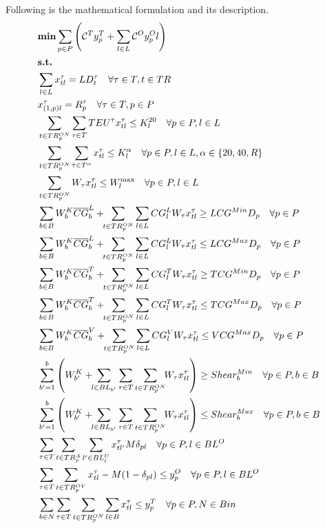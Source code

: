 \documentclass[preprint,12pt,authoryear]{elsarticle}
\begin{document}
Following is the mathematical formulation and its description.
\begin{align}
    & \text{\bf min} \sum_{p\in P} \left(\mathcal{C}^Ty^T_p + \sum_{l\in L} \mathcal{C}^Oy^O_pl \right) \label{pacino:obj}\\
    & \text{\bf s.t.}\nonumber \\
    & \sum_{l\in L} x^\tau_{tl} = LD^\tau_t \quad \forall \tau \in T, t \in TR \label{pacino:loadall}\\
    & x^\tau_{(1,p)l} = R^\tau_p \quad \forall \tau \in T, p\in P \label{pacino:release}\\
    & \sum_{t \in TR^{ON}_p}\sum_{\tau \in T} TEU^\tau x^\tau_{tl} \leq K^{20}_l \quad \forall p\in P, l\in L\label{pacino:capTEU}\\
    & \sum_{t \in TR^{ON}_p}\sum_{\tau \in T^\alpha} x^\tau_{tl} \leq K^{\alpha}_l \quad \forall p\in P, l\in L, \alpha\in \{20,40,R\}\label{pacino:cap}\\
    &\sum_{t \in TR^{ON}_p}W_\tau x^\tau_{tl} \leq W^{\max}_l \quad \forall p\in P, l\in L \label{pacino:weight}\\
    &\sum_{b\in B}W^K_b\overline{CG}^L_b +\!\! \sum_{t \in TR^{ON}_p}\sum_{l\in L}CG^L_lW_\tau x^\tau_{tl} \geq LCG^{Min}D_p \quad \forall p\in P\label{pacino:minLCG}\\
    &\sum_{b\in B}W^K_b\overline{CG}^L_b +\!\! \sum_{t \in TR^{ON}_p}\sum_{l\in L}CG^L_lW_\tau x^\tau_{tl} \leq LCG^{Max}D_p \quad \forall p\in P\label{pacino:maxLCG}\\
    &\sum_{b\in B}W^K_b\overline{CG}^T_b +\!\! \sum_{t \in TR^{ON}_p}\sum_{l\in L}CG^T_lW_\tau x^\tau_{tl} \geq TCG^{Min}D_p \quad \forall p\in P\label{pacino:minTCG}\\
    &\sum_{b\in B}W^K_b\overline{CG}^T_b +\!\! \sum_{t \in TR^{ON}_p}\sum_{l\in L}CG^T_lW_\tau x^\tau_{tl} \leq TCG^{Max}D_p \quad \forall p\in P\label{pacino:maxTCG}\\
    &\sum_{b\in B}W^K_b\overline{CG}^V_b +\!\! \sum_{t \in TR^{ON}_p}\sum_{l\in L}CG^V_lW_\tau x^\tau_{tl} \leq VCG^{Max}D_p \quad \forall p\in P\label{pacino:maxVCG}\\
    & \sum_{b'=1}^b\left( W^K_{b'} +\!\! \sum_{l\in BL_{b'}}\sum_{\tau\in T}\sum_{t \in TR^{ON}_p}\!\!W_\tau x^\tau_{tl} \right)\geq Shear^{Min}_b \quad \forall p \in P, b \in B\label{pacino:shearMin}\\
    & \sum_{b'=1}^b\left( W^K_{b'} +\!\! \sum_{l\in BL_{b'}}\sum_{\tau\in T}\sum_{t \in TR^{ON}_p}\!\!W_\tau x^\tau_{tl} \right)\leq Shear^{Max}_b \quad \forall p \in P, b \in B\label{pacino:shearMax}\\
    &\sum_{\tau \in T}\sum_{t\in TR^A_p}\sum_{l' \in BL^U_l}x^\tau_{tl'} M\delta_{pl} \quad \forall p\in P, l \in BL^O \label{pacino:delta}\\
    & \sum_{\tau \in T}\sum_{t\in TR^{OV}_p}x^\tau_{tl} - M(1-\delta_{pl})\leq y^O_p \quad \forall p\in P, l \in BL^O\label{pacino:hatch}\\
    &\sum_{b \in N}\sum_{\tau \in T}\sum_{t \in TR^{ON}_p}\sum_{l\in B} x^\tau_{tl} \leq y^T_p\quad \forall p\in P, N \in Bin \label{pacino:makespan}
\end{align}
\end{document}
